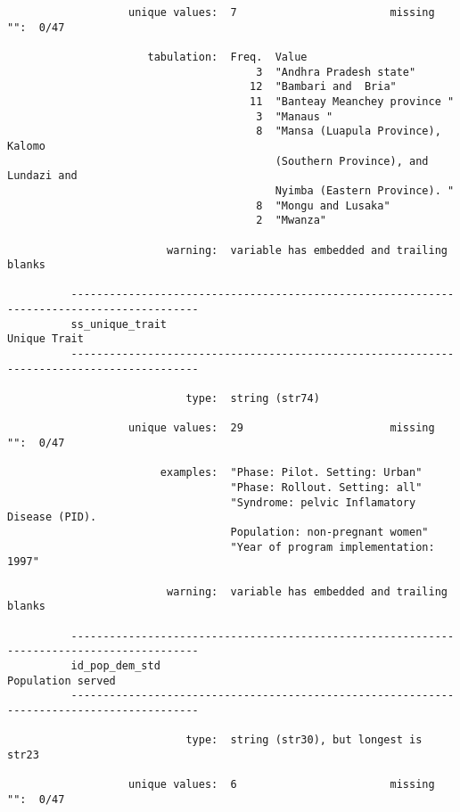 \documentclass{article}
\begin{document}
\begin{verbatim}
                   unique values:  7                        missing "":  0/47
          
                      tabulation:  Freq.  Value
                                       3  "Andhra Pradesh state"
                                      12  "Bambari and  Bria"
                                      11  "Banteay Meanchey province "
                                       3  "Manaus "
                                       8  "Mansa (Luapula Province), Kalomo
                                          (Southern Province), and Lundazi and
                                          Nyimba (Eastern Province). "
                                       8  "Mongu and Lusaka"
                                       2  "Mwanza"
          
                         warning:  variable has embedded and trailing blanks
          
          ------------------------------------------------------------------------------------------
          ss_unique_trait                                                               Unique Trait
          ------------------------------------------------------------------------------------------
          
                            type:  string (str74)
          
                   unique values:  29                       missing "":  0/47
          
                        examples:  "Phase: Pilot. Setting: Urban"
                                   "Phase: Rollout. Setting: all"
                                   "Syndrome: pelvic Inflamatory Disease (PID).
                                   Population: non-pregnant women"
                                   "Year of program implementation: 1997"
          
                         warning:  variable has embedded and trailing blanks
          
          ------------------------------------------------------------------------------------------
          id_pop_dem_std                                                           Population served
          ------------------------------------------------------------------------------------------
          
                            type:  string (str30), but longest is str23
          
                   unique values:  6                        missing "":  0/47
          

\end{verbatim}
\end{document}
